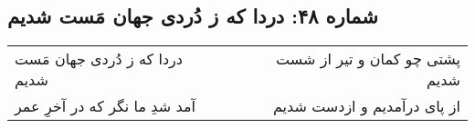 \begin{center}
\section*{شماره ۴۸: دردا که ز دُردی جهان مَست شدیم}
\label{sec:048}
\begin{longtable}{l p{0.5cm} r}
دردا که ز دُردی جهان مَست شدیم
&&
پشتی چو کمان و تیر از شست شدیم
\\
آمد شدِ ما نگر که در آخرِ عمر
&&
از پای درآمدیم و ازدست شدیم
\\
\end{longtable}
\end{center}
